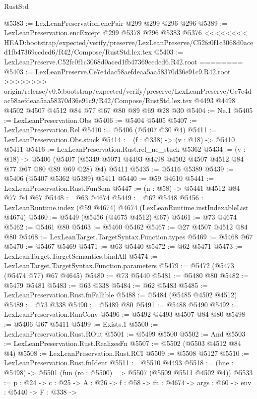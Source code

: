 \begin{lexlean}{RustStd}
\begin{coremodule}
{\begin{coremodule}
{{{{{{{{@5383 := LexLeanPreservation.encPair @299 @299 @296 @296
@5389 := LexLeanPreservation.encExcept @299 @5378 @296 @5383 @5376
<<<<<<<< HEAD:bootstrap/expected/verify/preserve/LexLeanPreserve/C52fc0f1c3068d0aced1fb47369ccdcd6/R42/Compose/RustStd.lex.tex
@5403 := LexLeanPreserve.C52fc0f1c3068d0aced1fb47369ccdcd6.R42.root
========
@5403 := LexLeanPreserve.Ce7e4dac58aefdeaa5aa58370d36e91c9.R42.root
>>>>>>>> origin/release/v0.5:bootstrap/expected/verify/preserve/LexLeanPreserve/Ce7e4dac58aefdeaa5aa58370d36e91c9/R42/Compose/RustStd.lex.tex
    @4493
    @4498
    @4502
    @4507
    @4512
    @84
    @77
    @67
    @80
    @89
    @69
    @28
    @30
@5404 := Ne.{1}
@5405 := LexLeanPreservation.Obs
@5406 := @5404 @5405
@5407 := LexLeanPreservation.Rel
@5410 := @5406 (@5407 @30 @4)
@5411 := LexLeanPreservation.Obs.stuck
@5414 := (f : @338) -> (v : @18) -> @5410 @5411
@5416 := LexLeanPreservation.Rust.rel_ne_stuck @5362
@5434 := (v : @18) ->
  @5406 (@5407 (@5349 @5071 @4493 @4498 @4502 @4507 @4512 @84 @77 @67 @80 @89 @69 @28) @4) @5411
@5435 := @5416 @5389
@5439 := @5406 (@5407 @5362 @5389) @5411
@5440 := @59 @4610
@5441 := LexLeanPreservation.Rust.FunSem
@5447 := (n : @58) -> @5441 @4512 @84 @77 @4 @67
@5448 := @63 @4674
@5449 := @62 @5448
@5456 := LexLeanRuntime.index (@59 @4674) @4674 (LexLeanRuntime.instIndexableList @4674)
@5460 := @5449 (@5456 (@4675 @4512) @67)
@5461 := @73 @4674
@5462 := @5461 @80
@5463 := @5460 @5462
@5467 := @27 @4507 @4512 @84 @80
@5468 := LexLeanTarget.TargetSyntax.Function.types
@5469 := @5468 @67
@5470 := @5467 @5469
@5471 := @63 @5440
@5472 := @62 @5471
@5473 := LexLeanTarget.TargetSemantics.bindAll
@5474 := LexLeanTarget.TargetSyntax.Function.parameters
@5479 := @5472 (@5473 (@5474 @77) @67 @4645)
@5480 := @73 @5440
@5481 := @5480 @80
@5482 := @5479 @5481
@5483 := @63 @338
@5484 := @62 @5483
@5485 := LexLeanPreservation.Rust.fnFallible
@5488 := @5484 (@5485 @4502 @4512)
@5489 := @73 @338
@5490 := @5489 @80
@5491 := @5488 @5490
@5492 := LexLeanPreservation.RunConv
@5496 := @5492 @4493 @4507 @84 @80
@5498 := @5406 @67 @5411
@5499 := Exists.{1}
@5500 := LexLeanPreservation.Rust.ROut
@5501 := @5499 @5500
@5502 := And
@5503 := LexLeanPreservation.Rust.RealizesFn
@5507 := @5502 (@5503 @4512 @84 @4)
@5508 := LexLeanPreservation.Rust.RCI
@5509 := @5508 @5127
@5510 := LexLeanPreservation.Rust.fnIdent
@5511 := @5510 @4493
@5518 := (hne : @5498) -> @5501 (fun (ro : @5500) => @5507 (@5509 @5511 @4502 @4))
@5533 := {p : @24} ->
  {c : @25} ->
  {A : @26} ->
  {f : @58} ->
  {fn : @4674} ->
  {args : @60} ->
  {env : @5440} ->
  {F : @338} ->
}}}}}}}}
\end{coremodule}}
\end{coremodule}
\end{lexlean}
